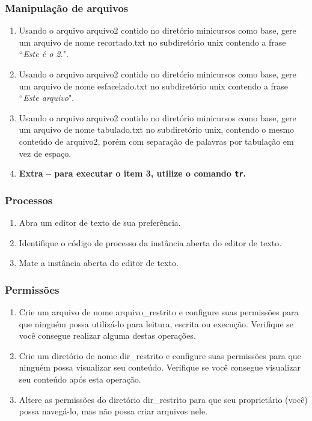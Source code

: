 \documentclass[a4paper,10pt,titlepage,twosided]{book}
\begin{document}
\subsubsection{Manipulação de arquivos}

\begin{enumerate}
\medskip
\item Usando o arquivo \textsf{arquivo2} contido no diretório \textsf{minicursos} como base, gere um arquivo de nome \textsf{recortado.txt} no subdiretório \textsf{unix} contendo a frase ``\emph{Este é o 2.}".
\item Usando o arquivo \textsf{arquivo2} contido no diretório \textsf{minicursos} como base, gere um arquivo de nome \textsf{esfacelado.txt} no subdiretório \textsf{unix} contendo a frase ``\emph{Este arquivo}".
\item Usando o arquivo \textsf{arquivo2} contido no diretório \textsf{minicursos} como base, gere um arquivo de nome \textsf{tabulado.txt} no subdiretório \textsf{unix}, contendo o mesmo conteúdo de \textsf{arquivo2}, porém com separação de palavras por tabulação em vez de espaço.
\item[] \textbf{Extra -- para executar o item 3, utilize o comando \texttt{tr}.}
\end{enumerate}

\subsubsection{Processos}

\begin{enumerate}
\medskip
\item Abra um editor de texto de sua preferência.
\item Identifique o código de processo da instância aberta do editor de texto.
\item Mate a instância aberta do editor de texto.
\end{enumerate}

\subsubsection{Permissões}

\begin{enumerate}
\medskip
\item Crie um arquivo de nome \textsf{arquivo\_restrito} e configure suas permissões para que ninguém possa utilizá-lo para leitura, escrita ou execução. Verifique se você consegue realizar alguma destas operações.
\item Crie um diretório de nome \textsf{dir\_restrito} e configure suas permissões para que ninguém possa visualizar seu conteúdo. Verifique se você consegue visualizar seu conteúdo após esta operação.
\item Altere as permissões do diretório \textsf{dir\_restrito} para que seu proprietário (você) possa navegá-lo, mas não possa criar arquivos nele.
\end{enumerate}
\end{document}
